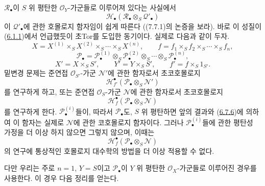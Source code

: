 \begin{scholium}[6.10.4]
\label{III.6.10.4-fr}
$\mathscr R_\bullet$이 $S$ 위 평탄한 $\mathscr O_Y$-가군들로
이루어져 있다는 사실에서
\[
  \mathscr H_\bullet
  (\mathscr R_\bullet\otimes_S\mathscr Q'_\bullet)
\]
이 $\mathscr Q'_\bullet$에 관한 호몰로지 함자임이 쉽게 따른다
((7.7.1)의 논증을 보라). 바로 이 성질이
(\hyperref[III.6.1.1-fr]{6.1.1})에서 언급했듯이 초Tor를 도입한
동기이다. 실제로 다음과 같이 두자.
\[
  X=X^{(1)}\times_SX^{(2)}\times_S\cdots\times_SX^{(n)},
  \qquad
  f=f_1\times_Sf_2\times_S\cdots\times_Sf_n,
\]
\[
  \mathscr P_\bullet
  =
  \mathscr P_\bullet^{(1)}
  \otimes_S\mathscr P_\bullet^{(2)}
  \otimes_S\cdots\otimes_S\mathscr P_\bullet^{(n)},
\]
\[
  X'=X\times_SS',
  \qquad
  Y'=Y\times_SS',
  \qquad
  f'=f\times_S1_{S'}.
\]
밑변경 문제는 준연접 $\mathscr O_{S'}$-가군 $\mathscr N'$에 관한
함자로서 초코호몰로지
\[
  \mathscr H^\bullet_{f'}
  (\mathscr P_\bullet\otimes_S\mathscr N')
\]
를 연구하게 하고, 또는 준연접 $\mathscr O_S$-가군 $\mathscr N$에
관한 함자로서 초코호몰로지
\[
  \mathscr H^\bullet_f
  (\mathscr P_\bullet\otimes_S\mathscr N)
\]
를 연구하게 한다. $\mathscr P_\bullet^{(i)}$들이, 따라서
$\mathscr P_\bullet$도, $S$ 위 평탄하면 앞의 결과와
(\hyperref[III.6.7.6-fr]{6.7.6})에 의하여 이 함자는 실제로
$\mathscr N$에 관한 코호몰로지 함자이다. 그러나
$\mathscr P_\bullet^{(i)}$들에 관한 평탄성 가정을 더 이상 하지
않으면 그렇지 않으며, 이때는
\[
  \mathscr H^\bullet_f
  (\mathscr P_\bullet\otimes_S\mathscr N)
\]
의 연구에 통상적인 호몰로지 대수학의 방법을 더 이상 적용할 수
없다.

다만 우리는 주로 $n=1$, $Y=S$이고 $\mathscr P_\bullet$이 $Y$ 위
평탄한 $\mathscr O_X$-가군들로 이루어진 경우를 사용한다. 이 경우
다음 정리를 얻는다.
\end{scholium}

